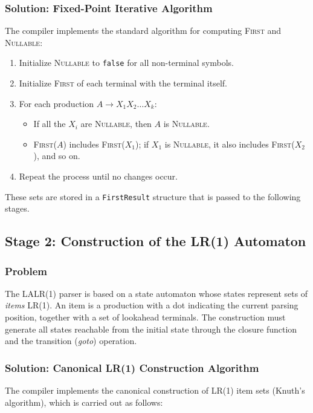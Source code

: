 \documentclass[12pt,a4paper]{report}
\begin{document}
\subsubsection{Solution: Fixed-Point Iterative Algorithm}
The compiler implements the standard algorithm for computing \textsc{First} and \textsc{Nullable}:

\begin{enumerate}
    \item Initialize \textsc{Nullable} to \texttt{false} for all non-terminal symbols.
    \item Initialize \textsc{First} of each terminal with the terminal itself.
    \item For each production $A \to X_1 X_2 \dots X_k$:
        \begin{itemize}
            \item If all the $X_i$ are \textsc{Nullable}, then $A$ is \textsc{Nullable}.
            \item \textsc{First}($A$) includes \textsc{First}($X_1$); if $X_1$ is \textsc{Nullable}, it also includes \textsc{First}($X_2$), and so on.
        \end{itemize}
    \item Repeat the process until no changes occur.
\end{enumerate}

These sets are stored in a \texttt{FirstResult} structure that is passed to the following stages.

\subsection{Stage 2: Construction of the LR(1) Automaton}

\subsubsection{Problem}
The LALR(1) parser is based on a state automaton whose states represent sets of \textit{items} LR(1).
An item is a production with a dot indicating the current parsing position, together with a set of lookahead terminals.
The construction must generate all states reachable from the initial state through the closure function and the transition (\textit{goto}) operation.

\subsubsection{Solution: Canonical LR(1) Construction Algorithm}
The compiler implements the canonical construction of LR(1) item sets (Knuth's algorithm), which is carried out as follows:
\end{document}

